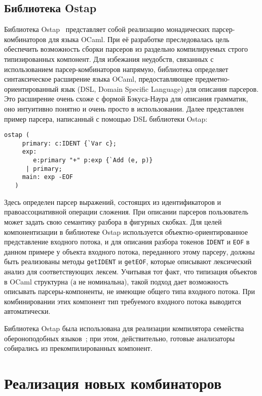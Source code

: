 \documentclass[conference]{IEEEtran}
\begin{document}
\subsection{Библиотека Ostap}

Библиотека Ostap~\cite{ostap} представляет собой реализацию монадических парсер-комбинаторов для языка OCaml. При её разработке преследовалась цель обеспечить возможность
сборки парсеров из раздельно компилируемых строго типизированных компонент. Для избежания неудобств, связанных с использованием парсер-комбинаторов напрямую, библиотека определяет
синтаксическое расширение языка OCaml, предоставляющее предметно-ориентированный язык (DSL, Domain Specific Language) для описания парсеров. Это расширение очень схоже с формой Бэкуса-Наура для описания грамматик, оно интуитивно понятно
и очень просто в использовании. Далее представлен пример парсера, написанный с помощью DSL библиотеки Ostap:

\begin{lstlisting}[basicstyle=\small]
   ostap (
     primary: c:IDENT {`Var c};
     exp:
        e:primary "+" p:exp {`Add (e, p)}
      | primary;
     main: exp -EOF
   )
\end{lstlisting}

Здесь определен парсер выражений, состоящих из идентификаторов и правоассоциативной операции сложения. При описании парсеров пользователь может задать свою семантику разбора в фигурных скобках.
Для целей компонентизации в библиотеке Ostap используется объектно-ориентированное представление входного потока, и для описания разбора токенов \lstinline|IDENT| и \lstinline|EOF| в данном
примере у объекта входного потока, переданного этому парсеру, должны быть реализованы методы \lstinline|getIDENT| и \lstinline|getEOF|, которые описывают лексический анализ для соответствующих
лексем. Учитывая тот факт, что типизация объектов в OCaml структурна (а не номинальна), такой подход дает возможность описывать парсеры-компоненты, не имеющие общего типа входного потока.
При комбинировании этих компонент тип требуемого входного потока выводится автоматически.

Библиотека Ostap была использована для реализации компилятора семейства обероноподобных языков~\cite{boulytchev2015combinators}; при этом, действительно, готовые анализаторы собирались из
прекомпилированных компонент.

\section{Реализация новых комбинаторов}
\end{document}

